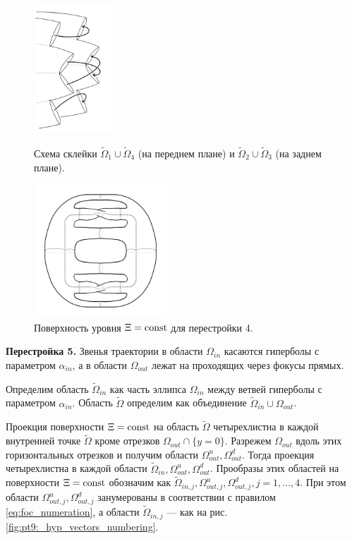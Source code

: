 \begin{figure}[!htb]
\centering
\includegraphics[width=3cm]{images/section2/atoms/atom_foc_hyp_iter1.pdf}
    \caption{Схема склейки $\widetilde{\Omega}_1 \cup \widetilde{\Omega}_4$ (на переднем плане) и $\widetilde{\Omega}_2 \cup \widetilde{\Omega}_3$ (на заднем плане).}
    \label{fig:pt9:_atom_foc_hyp_iter1}
    \endminipage\hfill
{}
    \centering
\includegraphics[width=5cm]{images/section2/atoms/atom_4.pdf}
    \caption{Поверхность уровня $\Xi = \mathrm{const}$ для перестройки 4.}
    \label{fig:pt9:_atom_4}
\endminipage\hfill
\end{figure}

\textbf{Перестройка 5.} 
Звенья траектории в области $\Omega_{in}$ касаются гиперболы с параметром $\alpha_{in}$, а в области $\Omega_{out}$ лежат на проходящих через фокусы прямых.

Определим область $\widetilde{\Omega}_{in}$ как часть эллипса $\Omega_{in}$ между ветвей гиперболы с параметром $\alpha_{in}$. 
Область $\widetilde{\Omega}$ определим как объединение $\widetilde{\Omega}_{in} \cup \Omega_{out}$.

Проекция поверхности $\Xi = \mathrm{const}$ на область $\widetilde{\Omega}$ четырехлистна в каждой внутренней точке $\widetilde{\Omega}$ кроме отрезков $\Omega_{out} \cap \{y=0\}$.
Разрежем $\Omega_{out}$ вдоль этих горизонтальных отрезков и получим области $\Omega_{out}^u,  \Omega_{out}^d$. 
Тогда проекция четырехлистна в каждой области $\widetilde{\Omega}_{in}, \Omega_{out}^u,  \Omega_{out}^d$. Прообразы этих областей на поверхности $\Xi = \mathrm{const}$  обозначим как $\widetilde{\Omega}_{in, j}, \Omega_{out, j}^u,  \Omega_{out, j}^d, j=1,\ldots, 4$. 
При этом области $\Omega_{out, j}^u,  \Omega_{out, j}^d$ занумерованы  в соответствии с правилом \eqref{eq:foc_numeration}, а области $\widetilde{\Omega}_{in, j}$ --- как на рис. \ref{fig:pt9:_hyp_vectors_numbering}.

